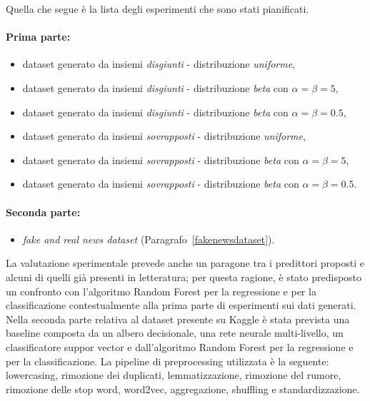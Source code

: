 \documentclass[12pt]{report}
\theoremstyle{definition}
\begin{document}
Quella che segue è la lista degli esperimenti che sono stati pianificati.

\paragraph{Prima parte:}
\begin{itemize}
    \item dataset generato da insiemi \textit{disgiunti} - distribuzione \textit{uniforme},
    \item dataset generato da insiemi \textit{disgiunti} - distribuzione \textit{beta} con $\alpha=\beta=5$,
    \item dataset generato da insiemi \textit{disgiunti} - distribuzione \textit{beta} con $\alpha=\beta=0.5$,
    \item dataset generato da insiemi \textit{sovrapposti} - distribuzione \textit{uniforme},
    \item dataset generato da insiemi \textit{sovrapposti} - distribuzione \textit{beta} con $\alpha=\beta=5$,
    \item dataset generato da insiemi \textit{sovrapposti} - distribuzione \textit{beta} con $\alpha=\beta=0.5$.
\end{itemize}
\paragraph{Seconda parte:}
\begin{itemize}
    \item \textit{fake and real news dataset} (Paragrafo~\ref{fakenewsdataset}).
\end{itemize}
La valutazione sperimentale prevede anche un paragone tra i predittori proposti e alcuni di quelli già presenti in letteratura; per questa ragione, è stato predisposto un confronto con l'algoritmo Random Forest per la regressione e per la classificazione contestualmente alla prima parte di esperimenti sui dati generati. Nella seconda parte relativa al dataset presente su Kaggle è stata prevista una baseline composta da un albero decisionale, una rete neurale multi-livello, un classificatore suppor vector e dall'algoritmo Random Forest per la regressione e per la classificazione.
La pipeline di preprocessing utilizzata è la seguente: lowercasing, rimozione dei duplicati, lemmatizzazione, rimozione del rumore, rimozione delle stop word, word2vec, aggregazione, shuffling e standardizzazione.
\end{document}
